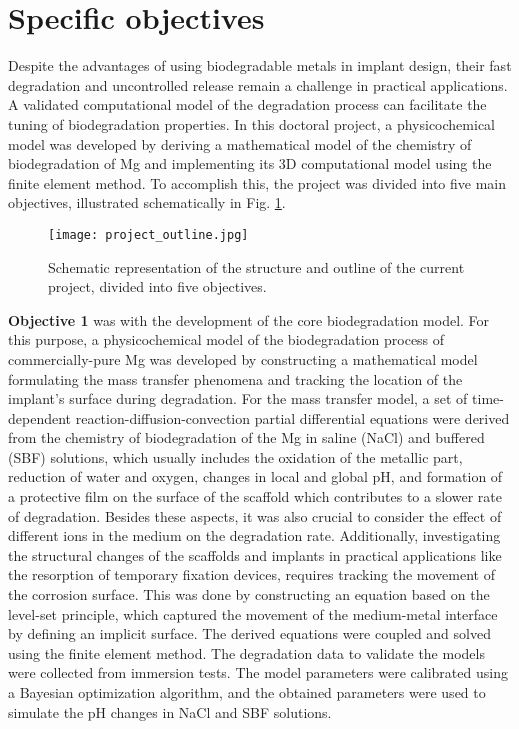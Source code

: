 \section{Specific objectives} \label{sec:aim_objective}

Despite the advantages of using biodegradable metals in implant design, their fast degradation and uncontrolled release remain a challenge in practical applications. A validated computational model of the degradation process can facilitate the tuning of biodegradation properties. In this doctoral project, a physicochemical model was developed by deriving a mathematical model of the chemistry of biodegradation of Mg and implementing its 3D computational model using the finite element method. To accomplish this, the project was divided into five main objectives, illustrated schematically in Fig. \ref{fig:objective_project_outline}.

\begin{figure}
\centering
\medskip
\texttt{[image: project\_outline.jpg]}
\caption[Schematic of the project outline]{Schematic representation of the structure and outline of the current project, divided into five objectives.} \label{fig:objective_project_outline}
\end{figure}

\textbf{Objective 1} was with the development of the core biodegradation model. For this purpose, a physicochemical model of the biodegradation process of commercially-pure Mg was developed by constructing a mathematical model formulating the mass transfer phenomena and tracking the location of the implant's surface during degradation. For the mass transfer model, a set of time-dependent reaction-diffusion-convection partial differential equations were derived from the chemistry of biodegradation of the Mg in saline (NaCl) and buffered (\gls{SBF}) solutions, which usually includes the oxidation of the metallic part, reduction of water and oxygen, changes in local and global pH, and formation of a protective film on the surface of the scaffold which contributes to a slower rate of degradation. Besides these aspects, it was also crucial to consider the effect of different ions in the medium on the degradation rate. Additionally, investigating the structural changes of the scaffolds and implants in practical applications like the resorption of temporary fixation devices, requires tracking the movement of the corrosion surface. This was done by constructing an equation based on the level-set principle, which captured the movement of the medium-metal interface by defining an implicit surface. The derived equations were coupled and solved using the finite element method. The degradation data to validate the models were collected from immersion tests. The model parameters were calibrated using a Bayesian optimization algorithm, and the obtained parameters were used to simulate the pH changes in NaCl and \gls{SBF} solutions.

